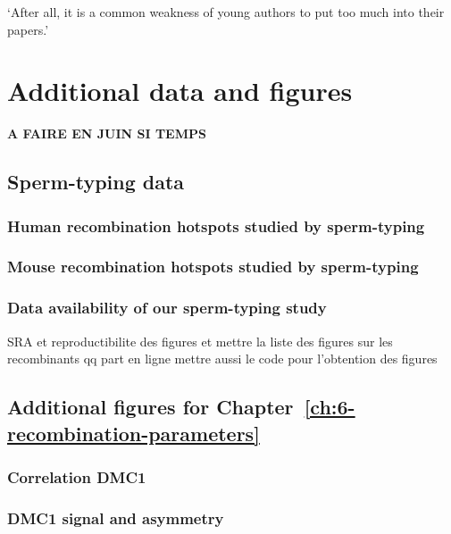 \begin{savequote}[8cm]
‘After all, it is a common weakness of young authors to put too much into their papers.’

\end{savequote}

\chapter{\label{app:list-hostpots}Additional data and figures}

\minitoc{}

\textbf{A FAIRE EN JUIN SI TEMPS}
\section{Sperm-typing data}
\subsection{Human recombination hotspots studied by sperm-typing}
\subsection{Mouse recombination hotspots studied by sperm-typing}
\subsection{Data availability of our sperm-typing study}
SRA et reproductibilite des figures
et mettre la liste des figures sur les recombinants qq part en ligne
mettre aussi le code pour l'obtention des figures
\section{Additional figures for Chapter~\ref{ch:6-recombination-parameters}}
\subsection{Correlation DMC1}
\subsection{DMC1 signal and asymmetry}
